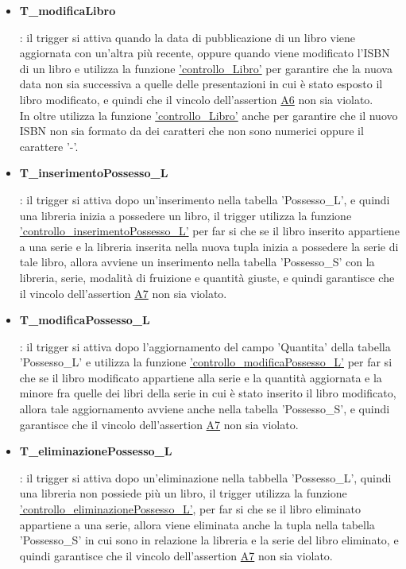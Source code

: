 \documentclass{article}
\begin{document}
\begin{itemize}
   \item \hypertarget{t17}{\textbf{T\_modificaLibro}}: il trigger si attiva quando la data di pubblicazione di un libro viene aggiornata con un'altra più recente, oppure quando viene modificato l'ISBN di un libro e utilizza la funzione \hyperlink{f17}{'controllo\_Libro'} per garantire che la nuova data non sia successiva a quelle delle presentazioni in cui è stato esposto il libro modificato, e quindi che il vincolo dell'assertion \hyperlink{assertion6}{A6} non sia violato.\\
   In oltre utilizza la funzione \hyperlink{f17}{'controllo\_Libro'} anche per garantire che il nuovo ISBN non sia formato da dei caratteri che non sono numerici oppure il carattere '-'.

   \item \hypertarget{t18}{\textbf{T\_inserimentoPossesso\_L}}: il trigger si attiva dopo un'inserimento nella tabella 'Possesso\_L', e quindi una libreria inizia a possedere un libro, il trigger utilizza la funzione \hyperlink{f18}{'controllo\_inserimentoPossesso\_L'} per far si che se il libro inserito appartiene a una serie e la libreria inserita nella nuova tupla inizia a possedere la serie di tale libro, allora avviene un inserimento nella tabella 'Possesso\_S' con la libreria, serie, modalità di fruizione e quantità giuste, e quindi garantisce che il vincolo dell'assertion \hyperlink{assertion7}{A7} non sia violato. 

   \item \hypertarget{t19}{\textbf{T\_modificaPossesso\_L}}: il trigger si attiva dopo l'aggiornamento del campo 'Quantita' della tabella 'Possesso\_L' e utilizza la funzione \hyperlink{f19}{'controllo\_modificaPossesso\_L'} per far si che se il libro modificato appartiene alla serie e la quantità aggiornata e la minore fra quelle dei libri della serie in cui è stato inserito il libro modificato, allora tale aggiornamento avviene anche nella tabella 'Possesso\_S', e quindi garantisce che il vincolo dell'assertion \hyperlink{assertion7}{A7} non sia violato.

   \item \hypertarget{t20}{\textbf{T\_eliminazionePossesso\_L}}: il trigger si attiva dopo un'eliminazione nella tabbella 'Possesso\_L', quindi una libreria non possiede più un libro, il trigger utilizza la funzione \hyperlink{f20}{'controllo\_eliminazionePossesso\_L'}, per far si che se il libro eliminato appartiene a una serie, allora viene eliminata anche la tupla nella tabella 'Possesso\_S' in cui sono in relazione la libreria e la serie del libro eliminato, e quindi garantisce che il vincolo dell'assertion \hyperlink{assertion7}{A7} non sia violato.


\end{itemize}
\end{document}
